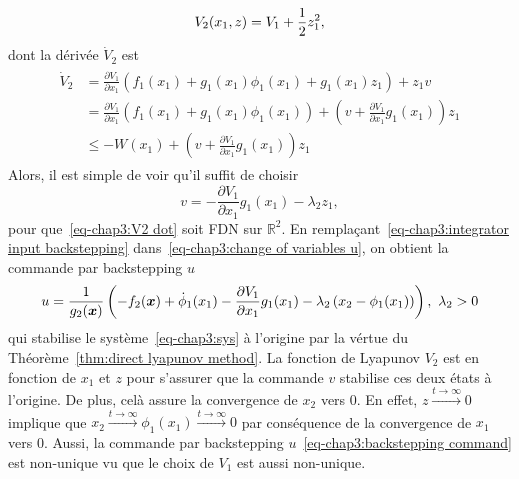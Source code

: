 \begin{equation}\label{eq-chap3:V2}
	V_2(x_1,z)=V_1 + \frac{1}{2} z_1^2,
\end{equation}	
dont la dérivée $\dot{V}_2$ est 
\begin{align}\label{eq-chap3:V2 dot}
	\begin{split}
		\dot{V}_2 &= \frac{\partial V_1}{\partial x_1}\left(f_1(x_1) + g_1(x_1)\phi_1(x_1) + g_1(x_1)z_1\right) + z_1v \\ 
		&= \frac{\partial V_1}{\partial x_1}\left(f_1(x_1) + g_1(x_1)\phi_1(x_1)\right) + \left(v + \frac{\partial V_1}{\partial x_1}g_1(x_1)\right)z_1 \\
		&\leq -W(x_1) + \left(v + \frac{\partial V_1}{\partial x_1}g_1(x_1)\right)z_1
	\end{split}
\end{align}
Alors, il est simple de voir qu'il suffit de choisir 
\begin{equation}\label{eq-chap3:integrator input backstepping}
	v= -\frac{\partial V_1}{\partial x_1}g_1(x_1) - \lambda_2z_1,
\end{equation}
pour que~\eqref{eq-chap3:V2 dot} soit FDN sur $\mathbb{R}^2$. En remplaçant~\eqref{eq-chap3:integrator input backstepping}
 dans~\eqref{eq-chap3:change of variables u}, on obtient la commande par backstepping $u$ 
\begin{equation}\label{eq-chap3:backstepping command}
	u = \frac{1}{g_2(\bm{x})}\left(-f_2(\bm{x}) +\dot{\phi}_1(x_1) -\frac{\partial V_1}{\partial x_1}g_1(x_1) - \lambda_2\left(x_2-\phi_1(x_1)\right)\right), \ \lambda_2>0
\end{equation}
qui stabilise le système~\eqref{eq-chap3:sys} à l'origine par la vértue du Théorème~\ref{thm:direct lyapunov method}. 
La fonction de Lyapunov $V_2$ est en fonction de $x_1$ et $z$ pour s'assurer que la commande $v$ stabilise ces deux états à l'origine. De plus, celà assure la convergence de $x_2$ vers 0. En effet, $z\overset{t\rightarrow\infty}{\longrightarrow}0$ implique que $ x_2\overset{t\rightarrow\infty}{\longrightarrow}\phi_1(x_1)\overset{t\rightarrow\infty}{\longrightarrow}0$ par conséquence de la convergence de $x_1$ vers 0. 
Aussi, la commande par backstepping $u$~\eqref{eq-chap3:backstepping command} est non-unique vu que le choix de $V_1$ est aussi non-unique. 

